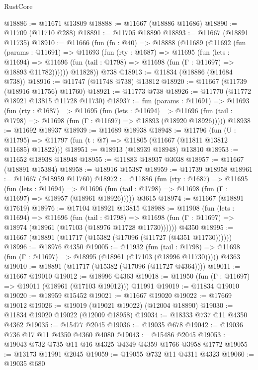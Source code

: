 \begin{lexlean}{RustCore}
\begin{coremodule}
@18886 := @11671 @13809
@18888 := @11667 (@18886 @11686)
@18890 := @11709 (@11710 @288)
@18891 := @11705 @18890
@18893 := @11667 (@18891 @11735)
@18910 := @11666
    (fun (fn : @40) =>
    @18888
      (@11689
        (@11692
          (fun (params : @11691) =>
          @11693
            (fun (rty : @1687) =>
            @11695
              (fun (lets : @11694) =>
              @11696 (fun (tail : @1798) => @11698 (fun (Γ : @11697) => @18893 @11782))))))
        @11828))
    @738
@18913 := @11834 (@18886 (@11684 @738))
@18916 := @11747 (@11748 @738) @13812
@18920 := @11667 (@11739 (@18916 @11756) @11760)
@18921 := @11773 @738
@18926 := @11770 (@11772 @18921 @13815 @11728 @11730)
@18937 := fun (params : @11691) =>
  @11693
    (fun (rty : @1687) =>
    @11695
      (fun (lets : @11694) =>
      @11696 (fun (tail : @1798) => @11698 (fun (Γ : @11697) => @18893 (@18920 @18926)))))
@18938 := @11692 @18937
@18939 := @11689 @18938
@18948 := @11796
    (fun (U : @11795) => @11797 (fun (t : @7) => @11805 (@11667 (@11811 @13812 @11685) @11822)))
@18951 := @18913 (@18939 @18948) @13810
@18953 := @11652 @18938 @18948
@18955 := @11883 @18937 @3038
@18957 := @11667 (@18891 @15384)
@18958 := @18916 @15387
@18959 := @11739 @18958
@18961 := @11667 (@18959 @11760)
@18972 := @11886
    (fun (rty : @1687) =>
    @11695
      (fun (lets : @11694) =>
      @11696 (fun (tail : @1798) => @11698 (fun (Γ : @11697) => @18957 (@18961 @18926)))))
    @3615
@18974 := @11667 (@18891 @17619)
@18976 := @17104 @18921 @13815
@18988 := @11908
    (fun (lets : @11694) =>
    @11696
      (fun (tail : @1798) =>
      @11698 (fun (Γ : @11697) => @18974 (@18961 (@17103 (@18976 @11728 @11730))))))
    @4350
@18995 := @11667 (@18891 (@11717 (@15382 (@17096 (@11727 (@4351 @11730))))))
@18996 := @18976 @4350
@19005 := @11932
    (fun (tail : @1798) => @11698 (fun (Γ : @11697) => @18995 (@18961 (@17103 (@18996 @11730)))))
    @4363
@19010 := @18891 (@11717 (@15382 (@17096 (@11727 @4364))))
@19011 := @11667 @19010
@19012 := @18996 @4363
@19018 := @11950 (fun (Γ : @11697) => @19011 (@18961 (@17103 @19012))) @11991
@19019 := @11834 @19010
@19020 := @18959 @15452
@19021 := @11667 @19020
@19022 := @17669 @19012
@19026 := @19019 (@19021 @19022) (@12004 @18890)
@19030 := @11834 @19020 @19022 (@12009 @18958)
@19034 := @18333 @737 @11 @4350 @4362
@19035 := @15477 @2045
@19036 := @19035 @678
@19042 := @19036 @736 @17 @11 @4350 @4360 @4080
@19043 := @15486 @2045
@19053 := @19043 @732 @735 @11 @16 @4325 @4349 @4359 @1766 @3958 @1772
@19055 := @13173 @11991 @2045
@19059 := @19055 @732 @11 @4311 @4323
@19060 := @19035 @680

\end{coremodule}
\end{lexlean}
